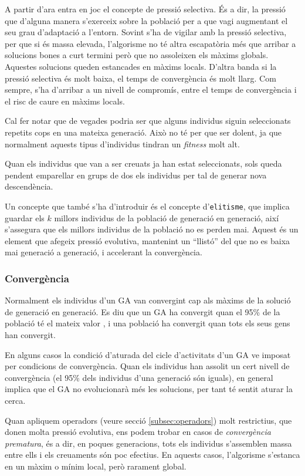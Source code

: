 A partir d'ara entra en joc el concepte de pressió selectiva. És a dir, la
pressió que d'alguna manera s'exerceix sobre la població per a que vagi
augmentant el seu grau d'adaptació a l'entorn. Sovint s'ha de vigilar amb la
pressió selectiva, per que si és massa elevada, l'algorisme no té altra
escapatòria més que arribar a solucions bones a curt termini però que no
assoleixen els màxims globals. Aquestes solucions queden estancades en màxims
locals. D'altra banda si la pressió selectiva és molt baixa, el temps de
convergència és molt llarg.  Com sempre, s'ha d'arribar a un nivell de
compromís, entre el temps de convergència i el risc de caure en màxims locals.

Cal fer notar que de vegades podria ser que alguns individus siguin seleccionats
repetits cops en una mateixa generació. Això no té per que ser dolent, ja que
normalment aquests tipus d'individus tindran un \emph{fitness} molt alt.

Quan els individus que van a ser creuats ja han estat seleccionats, sols queda
pendent emparellar en grups de dos els individus per tal de generar nova
descendència. 

Un concepte que també s'ha d'introduir és el concepte d'\texttt{elitisme}, que
implica guardar els $k$ millors individus de la població de generació en
generació, així s'assegura que els millors individus de la població no es perden
mai.  Aquest és un element que afegeix pressió evolutiva, mantenint un ``llistó''
del que no es baixa mai generació a generació, i accelerant la convergència.

\subsubsection{Convergència} 

Normalment els individus d'un GA van convergint cap als màxims de la solució de
generació en generació. Es diu que un GA ha convergit quan el 95\% de la
població té el mateix valor \cite{D75}, i una població ha convergit quan tots
els seus gens han convergit.

En alguns casos la condició d'aturada del cicle d'activitats d'un GA ve imposat
per condicions de convergència.  Quan els individus han assolit un cert nivell de
convergència (el 95\% dels individus d'una generació són iguals), en general
implica que el GA no evolucionarà més les solucions, per tant té sentit aturar
la cerca.

Quan apliquem operadors (veure secció \ref{subsec:operadors}) molt restrictius,
que donen molta pressió evolutiva, ens podem trobar en casos de
\emph{convergència prematura}, és a dir, en poques generacions, tots els
individus s'assemblen massa entre ells i els creuaments són poc efectius.  En
aquests casos, l'algorisme s'estanca en un màxim o mínim local, però rarament
global.

